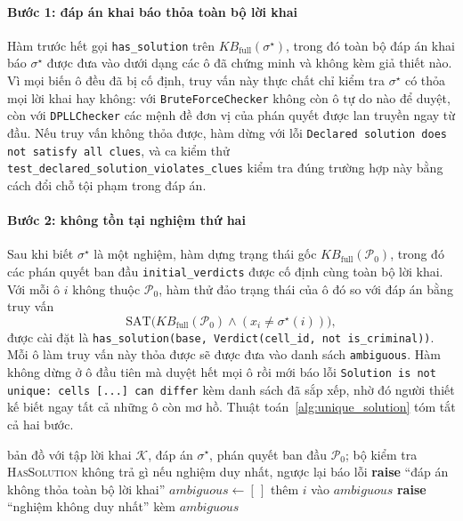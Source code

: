 \begin{sloppypar}
\paragraph{Bước 1: đáp án khai báo thỏa toàn bộ lời khai}
Hàm trước hết gọi \texttt{has\_solution} trên
$\mathit{KB}_{\mathrm{full}}(\sigma^\star)$, trong đó toàn bộ đáp án khai báo
$\sigma^\star$ được đưa vào dưới dạng các ô đã chứng minh và không kèm giả thiết
nào. Vì mọi biến ô đều đã bị cố định, truy vấn này thực chất chỉ kiểm tra
$\sigma^\star$ có thỏa mọi lời khai hay không: với \texttt{BruteForceChecker}
không còn ô tự do nào để duyệt, còn với \texttt{DPLLChecker} các mệnh đề đơn vị
của phán quyết được lan truyền ngay từ đầu. Nếu truy vấn không thỏa được, hàm
dừng với lỗi \texttt{Declared solution does not satisfy all clues}, và ca kiểm
thử \texttt{test\_declared\_solution\_violates\_clues} kiểm tra đúng trường hợp
này bằng cách đổi chỗ tội phạm trong đáp án.

\paragraph{Bước 2: không tồn tại nghiệm thứ hai}
Sau khi biết $\sigma^\star$ là một nghiệm, hàm dựng trạng thái gốc
$\mathit{KB}_{\mathrm{full}}(\mathcal{P}_0)$, trong đó các phán quyết ban đầu
\texttt{initial\_verdicts} được cố định cùng toàn bộ lời khai. Với mỗi ô $i$
không thuộc $\mathcal{P}_0$, hàm thử đảo trạng thái của ô đó so với đáp án bằng
truy vấn
\begin{equation}
  \mathrm{SAT}\bigl(\mathit{KB}_{\mathrm{full}}(\mathcal{P}_0) \land
  (x_i \ne \sigma^\star(i))\bigr),
  \label{eq:flip_query}
\end{equation}
được cài đặt là \texttt{has\_solution(base, Verdict(cell\_id, not
is\_criminal))}. Mỗi ô làm truy vấn này thỏa được sẽ được đưa vào danh sách
\texttt{ambiguous}. Hàm không dừng ở ô đầu tiên mà duyệt hết mọi ô rồi mới báo
lỗi \texttt{Solution is not unique: cells [...] can differ} kèm danh sách đã sắp
xếp, nhờ đó người thiết kế biết ngay tất cả những ô còn mơ hồ.
Thuật toán~\ref{alg:unique_solution} tóm tắt cả hai bước.

\begin{algorithm}[htbp]
  \caption{\texttt{\_check\_unique\_solution}}
  \label{alg:unique_solution}
  \begin{algorithmic}[1]
    \Require bản đồ với tập lời khai $\mathcal{K}$, đáp án $\sigma^\star$,
      phán quyết ban đầu $\mathcal{P}_0$; bộ kiểm tra \textsc{HasSolution}
    \Ensure không trả gì nếu nghiệm duy nhất, ngược lại báo lỗi
      \State \textbf{raise} ``đáp án không thỏa toàn bộ lời khai''
    \EndIf
    \State $\mathit{ambiguous} \gets [\,]$
        \State thêm $i$ vào $\mathit{ambiguous}$
      \EndIf
    \EndFor
      \State \textbf{raise} ``nghiệm không duy nhất'' kèm $\mathit{ambiguous}$
    \EndIf
  \end{algorithmic}
\end{algorithm}


\end{sloppypar}
